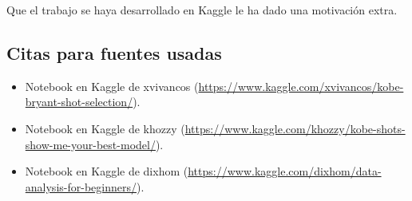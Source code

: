 \documentclass[
]{article}
\providecommand{\tightlist}{%
  \setlength{\itemsep}{0pt}\setlength{\parskip}{0pt}}
\begin{document}
Que el trabajo se haya desarrollado en Kaggle le ha dado una motivación
extra.

\hypertarget{citas-para-fuentes-usadas}{%
\subsection{\texorpdfstring{\textbf{Citas para fuentes
usadas}}{Citas para fuentes usadas}}\label{citas-para-fuentes-usadas}}

\begin{itemize}
\tightlist
\item
  Notebook en Kaggle de xvivancos
  (\url{https://www.kaggle.com/xvivancos/kobe-bryant-shot-selection/}).
\item
  Notebook en Kaggle de khozzy
  (\url{https://www.kaggle.com/khozzy/kobe-shots-show-me-your-best-model/}).
\item
  Notebook en Kaggle de dixhom
  (\url{https://www.kaggle.com/dixhom/data-analysis-for-beginners/}).
\end{itemize}
\end{document}
